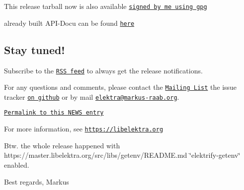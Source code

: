 This release tarball now is also available \href{https://www.libelektra.org/ftp/elektra/releases/elektra-0.8.14.tar.gz.gpg}{\tt signed by me using gpg}

already built A\+P\+I-\/\+Docu can be found \href{https://doc.libelektra.org/api/0.8.14/html/}{\tt here}

\subsection*{Stay tuned!}

Subscribe to the \href{https://doc.libelektra.org/news/feed.rss}{\tt R\+SS feed} to always get the release notifications.

For any questions and comments, please contact the \href{https://lists.sourceforge.net/lists/listinfo/registry-list}{\tt Mailing List} the issue tracker \href{https://git.libelektra.org/issues}{\tt on github} or by mail \href{mailto:elektra@markus-raab.org}{\tt elektra@markus-\/raab.\+org}.

\href{https://doc.libelektra.org/news/519cbfac-6db5-4594-8a38-dec4c84b134f.html}{\tt Permalink to this N\+E\+WS entry}

For more information, see \href{https://libelektra.org}{\tt https\+://libelektra.\+org}

Btw. the whole release happened with https\+://master.libelektra.\+org/src/libs/getenv/\+R\+E\+A\+D\+ME.md \char`\"{}elektrify-\/getenv\char`\"{} enabled.

Best regards, Markus 